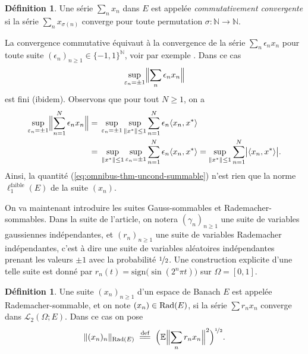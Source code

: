 \documentclass{smfart}
\theoremstyle{plain}
\theoremstyle{definition}
\newtheorem{definition}[theorem]{Définition}
\newcommand{\EE}{\mathbb E}
\newcommand\N{{\mathbb N}}
\newcommand {\eps}{\varepsilon}
\newcommand {\FAIBLE} {\text{faible}}
\newcommand{\demi}{{\nicefrac{1}{2}}}
\newcommand {\RADcv}{\text{\rm Rad}}
\newcommand {\defequal} {\; \overset{\text{def}}{=\joinrel=} \;}
\newcommand {\norm}[1] {\| #1 \|}               %
\newcommand {\Bignorm}[1]{\Bigl\| #1 \Bigr\|}
\newcommand {\ELL} {{\mathcal L}}
\begin{document}



\noindent 
\begin{definition}
  Une série $\sum_n x_n$ dans $E$ est appelée {\it commutativement
    convergente} si la série $\sum_n x_{\sigma(n)}$ converge pour
  toute permutation $\sigma:\N \to \N$.
\end{definition}

\noindent La convergence commutative équivaut à la convergence de la
série $\sum_n \epsilon_n x_n$ pour toute suite $(\epsilon_n)_{n\ge
  1}\in \{-1,1\}^{\N}$, voir par exemple \cite[Théorème 1.9]{DJT}. Dans
ce cas
\begin{equation}  \label{eq:omnibus-thm-uncond-summable}
   \sup_{\eps_n = \pm 1}  \Bignorm{ \sum_n \epsilon_n x_n } 
\end{equation}
est fini (ibidem). Observons que pour tout $N \ge 1$, on a
\begin{align*}
 \sup_{\eps_n = \pm 1}  \Bignorm{ \sum_{n=1}^N \epsilon_n x_n } 
= & \;  \sup_{\eps_n = \pm 1}  \sup_{\norm{x^*}\le 1 } \sum_{n=1}^N  \epsilon_n \langle x_n, x^* \rangle  \\
= & \;  \sup_{\norm{x^*}\le 1 } \sup_{\eps_n = \pm 1} \sum_{n=1}^N  \epsilon_n \langle x_n, x^* \rangle  
= \sup_{\norm{x^*}\le 1 } \sum_{n=1}^N  \bigl| \langle x_n, x^* \rangle \bigr|.
\end{align*}
Ainsi, la quantité (\ref{eq:omnibus-thm-uncond-summable}) n'est rien que la norme
$\ell_1^\FAIBLE(E)$ de la suite $(x_n)$.

\bigskip


\noindent On va maintenant introduire les suites Gauss-sommables et
Rademacher-sommables. Dans la suite de
l'article, on notera $(\gamma_n)_{n\ge 1}$ une suite de variables 
gaussiennes indépendantes, et $(r_n)_{n\ge 1}$ une suite de variables
Rademacher indépendantes, c'est à dire une suite de variables
aléatoires indépendantes prenant les valeurs $\pm 1$ avec la
probabilité $\demi$. Une construction explicite d'une telle suite est
donné par $r_n(t) = \text{sign} \bigl( \sin(2^n \pi t)\bigr)$ sur
$\Omega=[0,1]$.

\begin{definition}\label{def:RAD}
  Une suite $(x_n)_{n\ge 1}$ d'un espace de Banach $E$ est appelée
  Rademacher-sommable, et on note  $(x_n) \in \RADcv(E)$, si la série $\sum
  r_n x_n$ converge dans $\ELL_2(\Omega; E)$. Dans ce cas on pose
\[
   \norm{  (x_n)_n }_{\RADcv(E)} \defequal   \Bigl( \EE \Bignorm{ \sum_{n} r_n x_n }^2 \Bigr)^\demi.
\]
\end{definition}
\end{document}
